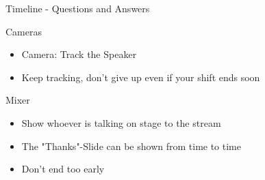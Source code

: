 \begin{frame}{Timeline - Questions and Answers}
	\begin{block}{Cameras}
		\begin{itemize}
			\item Camera: Track the Speaker
			\item Keep tracking, don't give up even if your shift ends soon
		\end{itemize}
	\end{block}
	\begin{block}{Mixer}
		\begin{itemize}
			\item Show whoever is talking on stage to the stream
			\item The "Thanks"-Slide can be shown from time to time
			\item Don't end too early
		\end{itemize}
	\end{block}
\end{frame}
